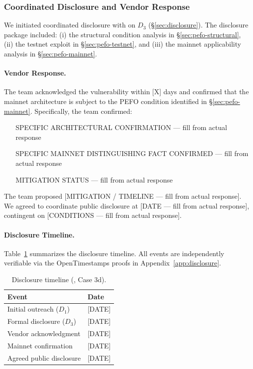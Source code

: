 
\subsubsection{Coordinated Disclosure and Vendor Response}
\label{sec:pefo-disclosure-3d}

We initiated coordinated disclosure with \DEPLOYEDAPP{} on $D_3$
(\S\ref{sec:disclosure}). The disclosure package included: (i) the structural
condition analysis in \S\ref{sec:pefo-structural}, (ii) the testnet exploit
in \S\ref{sec:pefo-testnet}, and (iii) the mainnet applicability analysis
in \S\ref{sec:pefo-mainnet}.

\paragraph{Vendor Response.}
The \DEPLOYEDAPP{} team acknowledged the vulnerability within [X] days and
confirmed that the mainnet architecture is subject to the PEFO condition
identified in \S\ref{sec:pefo-mainnet}. Specifically, the team confirmed:

\begin{enumerate}
  \item [SPECIFIC ARCHITECTURAL CONFIRMATION — fill from actual response]
  \item [SPECIFIC MAINNET DISTINGUISHING FACT CONFIRMED — fill from actual response]
  \item [MITIGATION STATUS — fill from actual response]
\end{enumerate}

The team proposed [MITIGATION / TIMELINE — fill from actual response].
We agreed to coordinate public disclosure at [DATE — fill from actual response],
contingent on [CONDITIONS — fill from actual response].

\paragraph{Disclosure Timeline.}
Table~\ref{tab:disclosure-timeline-3d} summarizes the disclosure timeline.
All events are independently verifiable via the OpenTimestamps proofs in
Appendix~\ref{app:disclosure}.

\begin{table}[h]
\centering
\caption{Disclosure timeline (\DEPLOYEDAPP{}, Case 3d).}
\label{tab:disclosure-timeline-3d}
\begin{tabular}{ll}
\toprule
Event & Date \\
\midrule
Initial outreach ($D_1$) & [DATE] \\
Formal disclosure ($D_3$) & [DATE] \\
Vendor acknowledgment & [DATE] \\
Mainnet confirmation & [DATE] \\
Agreed public disclosure & [DATE] \\
\bottomrule
\end{tabular}
\end{table}

